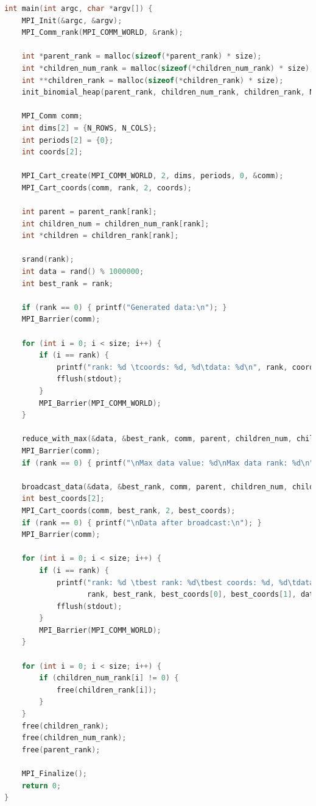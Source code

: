 \documentclass[a4paper]{article}
\begin{document}
\begin{lstlisting}[caption=transputer\_matrix.c, label={lst:1}, language=C]
int main(int argc, char *argv[]) {
    MPI_Init(&argc, &argv);
    MPI_Comm_rank(MPI_COMM_WORLD, &rank);

    int *parent_rank = malloc(sizeof(*parent_rank) * size);
    int *children_num_rank = malloc(sizeof(*children_num_rank) * size);
    int **children_rank = malloc(sizeof(*children_rank) * size);
    init_binomial_heap(parent_rank, children_num_rank, children_rank, NULL_RANK);

    MPI_Comm comm;
    int dims[2] = {N_ROWS, N_COLS};
    int periods[2] = {0};
    int coords[2];

    MPI_Cart_create(MPI_COMM_WORLD, 2, dims, periods, 0, &comm);
    MPI_Cart_coords(comm, rank, 2, coords);

    int parent = parent_rank[rank];
    int children_num = children_num_rank[rank];
    int *children = children_rank[rank];

    srand(rank);
    int data = rand() % 1000000;
    int best_rank = rank;

    if (rank == 0) { printf("Generated data:\n"); }
    MPI_Barrier(comm);

    for (int i = 0; i < size; i++) {
        if (i == rank) {
            printf("rank: %d \tcoords: %d, %d\tdata: %d\n", rank, coords[0], coords[1], data);
            fflush(stdout);
        }
        MPI_Barrier(MPI_COMM_WORLD);
    }

    reduce_with_max(&data, &best_rank, comm, parent, children_num, children);
    MPI_Barrier(comm);
    if (rank == 0) { printf("\nMax data value: %d\nMax data rank: %d\n", data, best_rank); }

    broadcast_data(&data, &best_rank, comm, parent, children_num, children);
    int best_coords[2];
    MPI_Cart_coords(comm, best_rank, 2, best_coords);
    if (rank == 0) { printf("\nData after broadcast:\n"); }
    MPI_Barrier(comm);

    for (int i = 0; i < size; i++) {
        if (i == rank) {
            printf("rank: %d \tbest rank: %d\tbest coords: %d, %d\tdata: %d\n",
                   rank, best_rank, best_coords[0], best_coords[1], data);
            fflush(stdout);
        }
        MPI_Barrier(MPI_COMM_WORLD);
    }

    for (int i = 0; i < size; i++) {
        if (children_num_rank[i] != 0) {
            free(children_rank[i]);
        }
    }
    free(children_rank);
    free(children_num_rank);
    free(parent_rank);

    MPI_Finalize();
    return 0;
}

\end{lstlisting}
\end{document}
